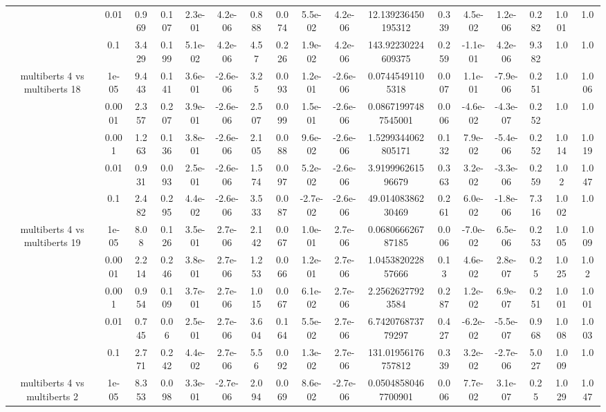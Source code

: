 \begin{tabular}{|c|c|c|c|c|c|c|c|c|c|c|c|c|c|c|c|c|}
 & 0.01 & 0.969 & 0.107 & 2.3e-01 & 4.2e-06 & 0.888 & 0.074 & 5.5e-02 & 4.2e-06 & 12.139236450195312 & 0.339 & 4.5e-02 & 1.2e-06 & 0.282 & 1.001 & 1.0 \\
 & 0.1 & 3.429 & 0.199 & 5.1e-02 & 4.2e-06 & 4.57 & 0.226 & 1.9e-02 & 4.2e-06 & 143.92230224609375 & 0.259 & -1.1e-01 & 4.2e-06 & 9.382 & 1.0 & 1.0 \\
\hline
\multirow{5}{*}{multiberts 4 vs multiberts 18} & 1e-05 & 9.443 & 0.141 & 3.6e-01 & -2.6e-06 & 3.25 & 0.093 & 1.2e-01 & -2.6e-06 & 0.07445491105318 & 0.007 & 1.1e-01 & -7.9e-06 & 0.251 & 1.0 & 1.006 \\
 & 0.0001 & 2.357 & 0.207 & 3.9e-01 & -2.6e-06 & 2.507 & 0.099 & 1.5e-01 & -2.6e-06 & 0.08671997487545001 & 0.006 & -4.6e-02 & -4.3e-07 & 0.252 & 1.0 & 1.0 \\
 & 0.001 & 1.263 & 0.136 & 3.8e-01 & -2.6e-06 & 2.105 & 0.088 & 9.6e-02 & -2.6e-06 & 1.5299344062805171 & 0.132 & 7.9e-02 & -5.4e-06 & 0.252 & 1.014 & 1.019 \\
 & 0.01 & 0.931 & 0.093 & 2.5e-01 & -2.6e-06 & 1.574 & 0.097 & 5.2e-02 & -2.6e-06 & 3.919996261596679 & 0.363 & 3.2e-02 & -3.3e-06 & 0.259 & 1.02 & 1.047 \\
 & 0.1 & 2.482 & 0.295 & 4.4e-02 & -2.6e-06 & 3.533 & 0.087 & -2.7e-02 & -2.6e-06 & 49.01408386230469 & 0.261 & 6.0e-02 & -1.8e-06 & 7.316 & 1.002 & 1.0 \\
\hline
\multirow{5}{*}{multiberts 4 vs multiberts 19} & 1e-05 & 8.08 & 0.126 & 3.5e-01 & 2.7e-06 & 2.142 & 0.067 & 1.0e-01 & 2.7e-06 & 0.068066626787185 & 0.006 & -7.0e-02 & 6.5e-06 & 0.253 & 1.005 & 1.009 \\
 & 0.0001 & 2.214 & 0.246 & 3.8e-01 & 2.7e-06 & 1.253 & 0.066 & 1.2e-01 & 2.7e-06 & 1.045382022857666 & 0.13 & 4.6e-02 & 2.8e-07 & 0.25 & 1.025 & 1.02 \\
 & 0.001 & 0.954 & 0.109 & 3.7e-01 & 2.7e-06 & 1.015 & 0.067 & 6.1e-02 & 2.7e-06 & 2.25626277923584 & 0.287 & 1.2e-02 & 6.9e-07 & 0.251 & 1.001 & 1.001 \\
 & 0.01 & 0.745 & 0.06 & 2.5e-01 & 2.7e-06 & 3.604 & 0.164 & 5.5e-02 & 2.7e-06 & 6.742076873779297 & 0.427 & -6.2e-02 & -5.5e-07 & 0.968 & 1.008 & 1.003 \\
 & 0.1 & 2.771 & 0.242 & 4.4e-02 & 2.7e-06 & 5.56 & 0.092 & 1.3e-02 & 2.7e-06 & 131.01956176757812 & 0.339 & 3.2e-02 & -2.7e-06 & 5.027 & 1.009 & 1.0 \\
\hline
\multirow{5}{*}{multiberts 4 vs multiberts 2} & 1e-05 & 8.353 & 0.098 & 3.3e-01 & -2.7e-06 & 2.094 & 0.069 & 8.6e-02 & -2.7e-06 & 0.05048580467700901 & 0.006 & 7.7e-02 & 3.1e-07 & 0.25 & 1.029 & 1.047 \\

\end{tabular}
